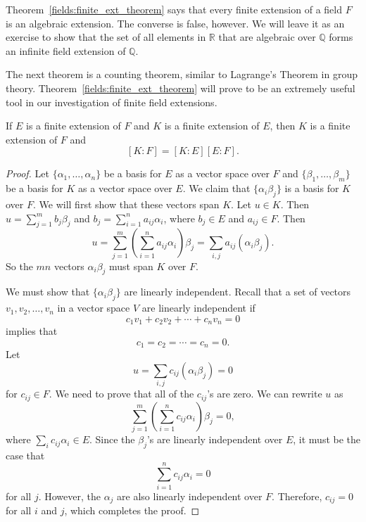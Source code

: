 \medskip


Theorem~\ref{fields:finite_ext_theorem} says that every finite extension of a field $F$ is an
algebraic extension. The converse is false, however. We will leave it
as an exercise to show that the set of all elements in ${\mathbb R}$ that
are algebraic over ${\mathbb Q}$ forms an infinite field extension of ${\mathbb
Q}$. 


\medskip


The next theorem is a counting theorem, similar to Lagrange's Theorem
in group theory. Theorem~\ref{fields:finite_ext_theorem} will prove to be an extremely useful
tool in our investigation of finite field extensions. 
 

\begin{theorem}
If $E$ is a finite extension of $F$ and $K$ is a finite extension of
$E$, then $K$ is a finite extension of $F$ and 
\[ 
[K:F]= [K:E] [E:F].
\]
\end{theorem}
 

\begin{proof}
Let $\{ \alpha_1, \ldots, \alpha_n \}$ be a basis for $E$ as a vector
space over $F$ and $\{ \beta_1, \ldots, \beta_m \}$ be a basis for
$K$ as a vector space over $E$. We claim that $\{ \alpha_i \beta_j
\}$ is a basis for $K$ over $F$.  
We will first show that these vectors span $K$. Let $u \in K$. Then $u
= \sum_{j=1}^{m} b_j \beta_j$ and $b_j = \sum_{i=1}^{n} a_{ij}
\alpha_i$, where $b_j \in E$ and $a_{ij} \in F$.	Then 
\[
u = \sum_{j=1}^{m} \left(  \sum_{i=1}^{n} a_{ij}
\alpha_i  \right) \beta_j = \sum_{i,j} a_{ij} ( \alpha_i
\beta_j ).
\]
So the $mn$ vectors $\alpha_i \beta_j$ must span $K$ over $F$. 


We must show that $\{ \alpha_i \beta_j \}$ are linearly independent.
Recall that a set of vectors $v_1, v_2, \ldots, v_n$ in a vector
space $V$ are linearly independent if 
\[
c_1 v_1 + c_2 v_2 + \cdots + c_n v_n = 0
\]
implies that
\[
c_1 = c_2 = \cdots = c_n = 0.
\]
Let 
\[
u = \sum_{i,j} c_{ij} ( \alpha_i \beta_j ) = 0
\]
for $c_{ij} \in F$. We need to prove that all of the $c_{ij}$'s are
zero. We can rewrite $u$ as
\[
\sum_{j=1}^{m} \left(  \sum_{i=1}^{n} c_{ij} \alpha_i
\right) \beta_j = 0,
\]
where $\sum_i c_{ij} \alpha_i \in E$.  Since the $\beta_j$'s are
linearly independent over $E$, it must be the case that 
\[
\sum_{i=1}^n c_{ij} \alpha_i = 0
\]
for all $j$. However, the $\alpha_j$ are also linearly independent 
over $F$.  Therefore, $c_{ij} = 0$ for all $i$ and $j$, which
completes the proof.
\end{proof}


